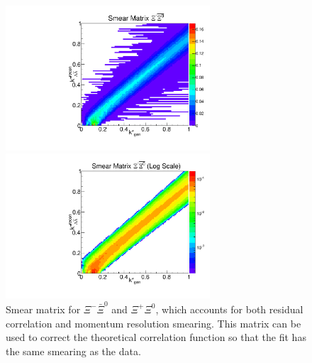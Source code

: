 \begin{figure}[h]
\begin{minipage}{18pc}
\includegraphics[width=18pc]{Figures/SmearMatrices/2016-7-19-SmearMatrixXiCXi0NormLA.pdf}
\end{minipage}\hspace{2pc}
\begin{minipage}{18pc}
\includegraphics[width=18pc]{Figures/SmearMatrices/2016-7-19-SmearMatrixXiCXi0NormLALog.pdf}
\end{minipage} 
\caption[Smear matrix -- $\Xi^{-}\bar{\Xi}^0$ and $\Xi^{+}\Xi^0$]{\label{fig:SmearXiCXi0LA}
Smear matrix for $\Xi^{-}\bar{\Xi}^0$ and $\Xi^{+}\Xi^0$, which accounts for both residual correlation and momentum resolution smearing. This matrix can be used to correct the theoretical correlation function so that the fit has the same smearing as the data.
}
\end{figure}



